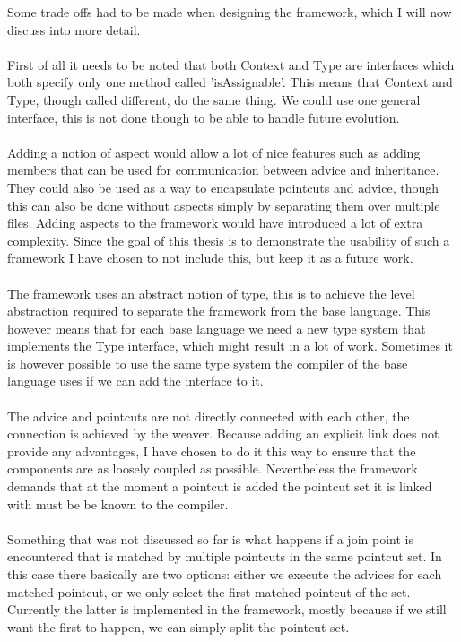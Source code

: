 \documentclass[a4paper]{report}
\begin{document}
Some trade offs had to be made when designing the framework, which I will now discuss into more detail.\\
\\
First of all it needs to be noted that both Context and Type are interfaces which both specify only one method called 'isAssignable'. This means that Context and Type, though called different, do the same thing. We could use one general interface, this is not done though to be able to handle future evolution.\\
\\
Adding a notion of aspect would allow a lot of nice features such as adding members that can be used for communication between advice and inheritance. They could also be used as a way to encapsulate pointcuts and advice, though this can also be done without aspects simply by separating them over multiple files. Adding aspects to the framework would have introduced a lot of extra complexity. Since the goal of this thesis is to demonstrate the usability of such a framework I have chosen to not include this, but keep it as a future work.\\
\\
The framework uses an abstract notion of type, this is to achieve the level abstraction required to separate the framework from the base language. This however means that for each base language we need a new type system that implements the Type interface, which might result in a lot of work. Sometimes it is however possible to use the same type system the compiler of the base language uses if we can add the interface to it.\\
\\
The advice and pointcuts are not directly connected with each other, the connection is achieved by the weaver. Because adding an explicit link does not provide any advantages, I have chosen to do it this way to ensure that the components are as loosely coupled as possible. Nevertheless the framework demands that at the moment a pointcut is added the pointcut set it is linked with must be be known to the compiler.\\
\\
Something that was not discussed so far is what happens if a join point is encountered that is matched by multiple pointcuts in the same pointcut set. In this case there basically are two options: either we execute the advices for each matched pointcut, or we only select the first matched pointcut of the set. Currently the latter is implemented in the framework, mostly because if we still want the first to happen, we can simply split the pointcut set.\\
\end{document}
